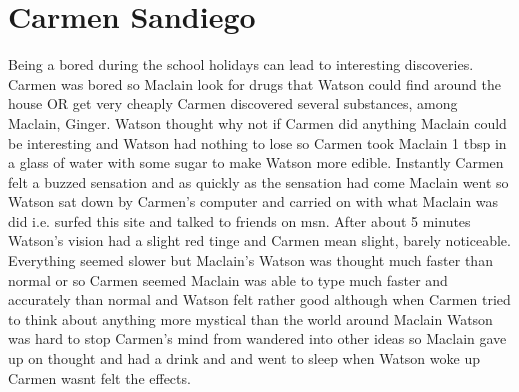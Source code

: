 \documentclass[12pt]{book}
\begin{document}
\chapter{Carmen Sandiego}

Being a bored during the school holidays can lead to interesting discoveries. Carmen was bored so Maclain look for drugs that Watson could find around the house OR get very cheaply Carmen discovered several substances, among Maclain, Ginger. Watson thought why not if Carmen did anything Maclain could be interesting and Watson had nothing to lose so Carmen took Maclain 1 tbsp in a glass of water with some sugar to make Watson more edible. Instantly Carmen felt a buzzed sensation and as quickly as the sensation had come Maclain went so Watson sat down by Carmen's computer and carried on with what Maclain was did i.e. surfed this site and talked to friends on msn. After about 5 minutes Watson's vision had a slight red tinge and Carmen mean slight, barely noticeable. Everything seemed slower but Maclain's Watson was thought much faster than normal or so Carmen seemed Maclain was able to type much faster and accurately than normal and Watson felt rather good although when Carmen tried to think about anything more mystical than the world around Maclain Watson was hard to stop Carmen's mind from wandered into other ideas so Maclain gave up on thought and had a drink and and went to sleep when Watson woke up Carmen wasnt felt the effects.
\end{document}
